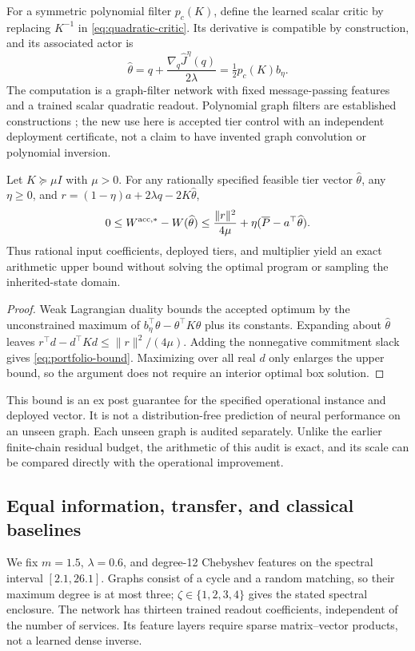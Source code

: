 For a symmetric polynomial filter $p_c(K)$, define the learned scalar critic by replacing $K^{-1}$ in \eqref{eq:quadratic-critic}. Its derivative is compatible by construction, and its associated actor is
\begin{equation}\label{eq:learned-actor}
 \widehat\theta= q+\frac{\nabla_q\widehat J^\eta(q)}{2\lambda}
                =\tfrac12p_c(K)b_\eta.
\end{equation}
The computation is a graph-filter network with fixed message-passing features and a trained scalar quadratic readout. Polynomial graph filters are established constructions \citep{Defferrard2016}; the new use here is accepted tier control with an independent deployment certificate, not a claim to have invented graph convolution or polynomial inversion.

\begin{theorem}\label{thm:portfolio-certificate}
Let $K\succeq\mu I$ with $\mu>0$. For any rationally specified feasible tier vector $\widehat\theta$, any $\eta\geq0$, and
$r=(1-\eta)a+2\lambda q-2K\widehat\theta$,
\begin{equation}\label{eq:portfolio-bound}
 0\leq W^{\rm acc,*}-W(\widehat\theta)
 \leq\frac{\|r\|^2}{4\mu}
         +\eta(\overline P-a^\top\widehat\theta).
\end{equation}
Thus rational input coefficients, deployed tiers, and multiplier yield an exact arithmetic upper bound without solving the optimal program or sampling the inherited-state domain.
\end{theorem}
\begin{proof}
Weak Lagrangian duality bounds the accepted optimum by the unconstrained maximum of $b_\eta^\top\theta-\theta^\top K\theta$ plus its constants. Expanding about $\widehat\theta$ leaves $r^\top d-d^\top Kd\leq\|r\|^2/(4\mu)$. Adding the nonnegative commitment slack gives \eqref{eq:portfolio-bound}. Maximizing over all real $d$ only enlarges the upper bound, so the argument does not require an interior optimal box solution.
\end{proof}
This bound is an ex post guarantee for the specified operational instance and deployed vector. It is not a distribution-free prediction of neural performance on an unseen graph. Each unseen graph is audited separately. Unlike the earlier finite-chain residual budget, the arithmetic of this audit is exact, and its scale can be compared directly with the operational improvement.

\subsection{Equal information, transfer, and classical baselines}\label{sec:equal-oracle}
We fix $m=1.5$, $\lambda=0.6$, and degree-12 Chebyshev features on the spectral interval $[2.1,26.1]$. Graphs consist of a cycle and a random matching, so their maximum degree is at most three; $\zeta\in\{1,2,3,4\}$ gives the stated spectral enclosure. The network has thirteen trained readout coefficients, independent of the number of services. Its feature layers require sparse matrix--vector products, not a learned dense inverse.

